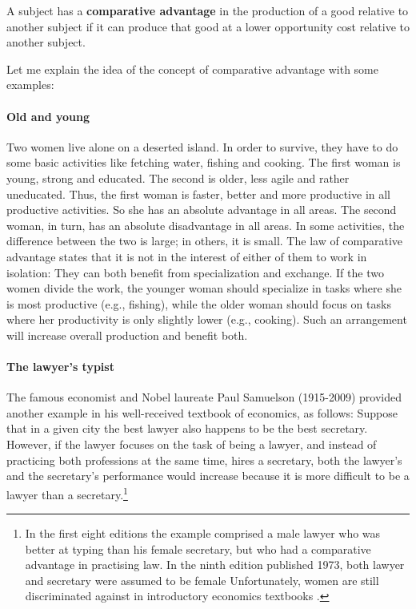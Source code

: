 A subject has a \textbf{comparative advantage} in the production of a good relative to another subject if it can produce that good at a lower opportunity cost relative to another subject. 

	Let me explain the idea of the concept of comparative advantage with some examples:
	\paragraph{Old and young}
	Two women live alone on a deserted island. In order to survive, they have to do some basic activities like fetching water, fishing and cooking. The first woman is young, strong and educated. The second is older, less agile and rather uneducated. Thus, the first woman is faster, better and more productive in all productive activities. So she has an absolute advantage in all areas. The second woman, in turn, has an absolute disadvantage in all areas. In some activities, the difference between the two is large; in others, it is small.
	The law of comparative advantage states that it is not in the interest of either of them to work in isolation: They can both benefit from specialization and exchange. If the two women divide the work, the younger woman should specialize in tasks where she is most productive (e.g., fishing), while the older woman should focus on tasks where her productivity is only slightly lower (e.g., cooking). Such an arrangement will increase overall production and benefit both.
	
	\paragraph{The lawyer's typist}
	The famous economist and Nobel laureate Paul Samuelson (1915-2009) provided another example in his well-received textbook of economics, as follows: Suppose that in a given city the best lawyer also happens to be the best secretary. 
	However, if the lawyer focuses on the task of being a lawyer, and instead of practicing both professions at the same time, hires a secretary, both the lawyer's and the secretary's performance would increase because it is more difficult to be a lawyer than a secretary.\footnote{In the first eight editions the example comprised a
		male lawyer who was better at typing than his female secretary, but who had a comparative
		advantage in practising law. In the ninth edition published 1973, both lawyer and secretary were assumed to
		be female \citep[see][]{Backhouse2019Paul} Unfortunately, women are still discriminated against in introductory economics textbooks \citep[see][]{Stevenson2018Representations}.}
	
